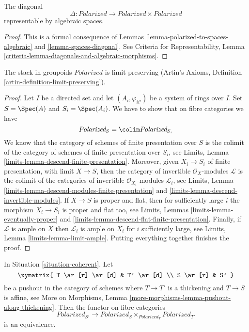 \begin{lemma}
\label{lemma-polarized-diagonal}
The diagonal
$$
\Delta : \textit{Polarized} \longrightarrow
\textit{Polarized} \times \textit{Polarized}
$$
representable by algebraic spaces.
\end{lemma}

\begin{proof}
This is a formal consequence of
Lemmas \ref{lemma-polarized-to-spaces-algebraic} and
\ref{lemma-spaces-diagonal}.
See Criteria for Representability, Lemma
\ref{criteria-lemma-diagonals-and-algebraic-morphisms}.
\end{proof}

\begin{lemma}
\label{lemma-polarized-limits}
The stack in groupoids $\textit{Polarized}$ is limit preserving
(Artin's Axioms, Definition \ref{artin-definition-limit-preserving}).
\end{lemma}

\begin{proof}
Let $I$ be a directed set and let $(A_i, \varphi_{ii'})$
be a system of rings over $I$. Set $S = \Spec(A)$ and
$S_i = \Spec(A_i)$. We have to show that on fibre categories we have
$$
\textit{Polarized}_S = \colim \textit{Polarized}_{S_i}
$$
We know that the category of schemes of finite presentation over
$S$ is the colimit of the category of schemes of finite presentation
over $S_i$, see
Limits, Lemma \ref{limits-lemma-descend-finite-presentation}.
Moreover, given $X_i \to S_i$ of finite presentation, with
limit $X \to S$, then the category of invertible
$\mathcal{O}_X$-modules $\mathcal{L}$ is the colimit of the categories
of invertible $\mathcal{O}_{X_i}$-modules $\mathcal{L}_i$, see
Limits, Lemma \ref{limits-lemma-descend-modules-finite-presentation} and
\ref{limits-lemma-descend-invertible-modules}.
If $X \to S$ is proper and flat, then for sufficiently large
$i$ the morphism $X_i \to S_i$ is proper and flat too, see
Limits, Lemmas \ref{limits-lemma-eventually-proper} and
\ref{limits-lemma-descend-flat-finite-presentation}.
Finally, if $\mathcal{L}$ is ample on $X$
then $\mathcal{L}_i$ is ample on $X_i$ for
$i$ sufficiently large, see
Limits, Lemma \ref{limits-lemma-limit-ample}.
Putting everything together finishes the proof.
\end{proof}

\begin{lemma}
\label{lemma-polarized-RS-star}
In Situation \ref{situation-coherent}. Let
$$
\xymatrix{
T \ar[r] \ar[d] & T' \ar[d] \\
S \ar[r] & S'
}
$$
be a pushout in the category of schemes where
$T \to T'$ is a thickening and $T \to S$ is affine, see
More on Morphisms, Lemma \ref{more-morphisms-lemma-pushout-along-thickening}.
Then the functor on fibre categories
$$
\textit{Polarized}_{S'}
\longrightarrow
\textit{Polarized}_S \times_{\textit{Polarized}_T} \textit{Polarized}_{T'}
$$
is an equivalence.
\end{lemma}

